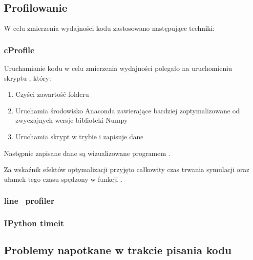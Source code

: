 

    \subsection{Profilowanie}
    W celu zmierzenia wydajności kodu zastosowano następujące techniki:
    \subsubsection{cProfile}
    Uruchamianie kodu w celu zmierzenia wydajności polegało na uruchomieniu skryptu , który:
    \begin{enumerate}
    \item Czyści zawartość folderu 
    \item Uruchamia środowisko Anaconda zawierające bardziej zoptymalizowane od zwyczajnych wersje biblioteki Numpy
    \item Uruchamia skrypt  w trybie  i zapisuje dane
    \end{enumerate}

    Następnie zapisane dane są wizualizowane programem .

    Za wskaźnik efektów optymalizacji przyjęto całkowity czas trwania symulacji oraz ułamek tego czasu spędzony w funkcji
    .
    \subsubsection{line\_profiler}
    \subsubsection{IPython timeit}

    \subsection{Problemy napotkane w trakcie pisania kodu} %
